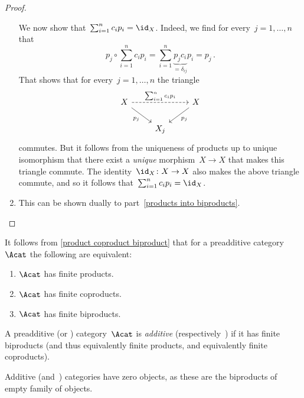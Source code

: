\begin{proof}
\begin{enumerate}
      We now show that~$\sum_{i=1}^n c_i p_i = \id_X$.
      Indeed, we find for every~$j = 1, \dotsc, n$ that
      \[
          p_j \circ \sum_{i=1}^n c_i p_i
        = \sum_{i=1}^n \underbrace{ p_j c_i }_{= \delta_{ij}} p_i
        = p_j \,.
      \]
      That shows that for every~$j = 1, \dotsc, n$ the triangle
      \[
        \begin{tikzcd}
            X
            \arrow{dr}[below left]{p_j}
            \arrow[dashed]{rr}[above]{\sum_{i=1}^n c_i p_i}
          & {}
          & X
            \arrow{dl}[below right]{p_j}
          \\
            {}
          & X_j
          &
        \end{tikzcd}
      \]
      commutes.
      But it follows from the uniqueness of products up to unique isomorphism that there exist a \emph{unique} morphism~$X \to X$ that makes this triangle commute.
      The identity~$\id_X \colon X \to X$ also makes the above triangle commute, and so it follows that~$\sum_{i=1}^n c_i p_i = \id_X$.
    \item
      This can be shown dually to part~\ref*{products into biproducts}.
    \qedhere
  \end{enumerate}
\end{proof}


\begin{remark}
  It follows from \cref{product coproduct biproduct} that for a preadditive category~$\Acat$ the following are equivalent:
  \begin{enumerate}
    \item
      $\Acat$ has finite products.
    \item
      $\Acat$ has finite coproducts.
    \item
      $\Acat$ has finite biproducts.
  \end{enumerate}
\end{remark}


\begin{definition}
  A preadditive (or {\preklin}) category~$\Acat$ is \emph{additive} (respectively~{\klin}) if it has finite biproducts (and thus equivalently finite products, and equivalently finite coproducts).
\end{definition}


\begin{remarknonum}
  Additive (and~{\klin}) categories have zero objects, as these are the biproducts of empty family of objects.
\end{remarknonum}


